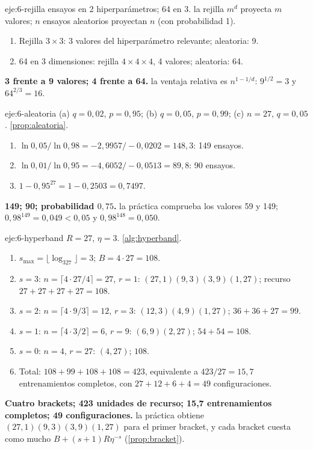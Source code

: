 \begin{solucion}{eje:6-rejilla}
 ensayos en 2 hiperparámetros; 64 en 3.
\planteamiento la rejilla $m^d$ proyecta $m$ valores; $n$ ensayos aleatorios proyectan $n$ (con probabilidad 1).
\pasos
\begin{enumerate}[label=\arabic*.]
  \item Rejilla $3\times3$: 3 valores del hiperparámetro relevante; aleatoria: 9.
  \item 64 en 3 dimensiones: rejilla $4\times4\times4$, 4 valores; aleatoria: 64.
\end{enumerate}
\resultado \textbf{3 frente a 9 valores; 4 frente a 64.}
\comprobacion la ventaja relativa es $n^{1-1/d}$: $9^{1/2}=3$ y $64^{2/3}=16$.
\end{solucion}

\begin{solucion}{eje:6-aleatoria}
\datos (a) $q=0{,}02$, $p=0{,}95$; (b) $q=0{,}05$, $p=0{,}99$; (c) $n=27$, $q=0{,}05$.
\planteamiento \cref{prop:aleatoria}.
\pasos
\begin{enumerate}[label=\arabic*.]
  \item $\ln0{,}05/\ln0{,}98=-2{,}9957/-0{,}0202=148{,}3$: 149 ensayos.
  \item $\ln0{,}01/\ln0{,}95=-4{,}6052/-0{,}0513=89{,}8$: 90 ensayos.
  \item $1-0{,}95^{27}=1-0{,}2503=0{,}7497$.
\end{enumerate}
\resultado \textbf{149; 90; probabilidad $0{,}75$.}
\comprobacion la práctica comprueba los valores 59 y 149; $0{,}98^{149}=0{,}049<0{,}05$ y $0{,}98^{148}=0{,}050$.
\end{solucion}

\begin{solucion}{eje:6-hyperband}
\datos $R=27$, $\eta=3$.
\planteamiento \cref{alg:hyperband}.
\pasos
\begin{enumerate}[label=\arabic*.]
  \item $s_{\max}=\lfloor\log_327\rfloor=3$; $B=4\cdot27=108$.
  \item $s=3$: $n=\lceil4\cdot27/4\rceil=27$, $r=1$: $(27,1)(9,3)(3,9)(1,27)$; recurso $27+27+27+27=108$.
  \item $s=2$: $n=\lceil4\cdot9/3\rceil=12$, $r=3$: $(12,3)(4,9)(1,27)$; $36+36+27=99$.
  \item $s=1$: $n=\lceil4\cdot3/2\rceil=6$, $r=9$: $(6,9)(2,27)$; $54+54=108$.
  \item $s=0$: $n=4$, $r=27$: $(4,27)$; $108$.
  \item Total: $108+99+108+108=423$, equivalente a $423/27=15{,}7$ entrenamientos completos, con $27+12+6+4=49$ configuraciones.
\end{enumerate}
\resultado \textbf{Cuatro brackets; 423 unidades de recurso; 15,7 entrenamientos completos; 49 configuraciones.}
\comprobacion la práctica obtiene $(27,1)(9,3)(3,9)(1,27)$ para el primer bracket, y cada bracket cuesta como mucho $B+(s+1)R\eta^{-s}$ (\cref{prop:bracket}).
\end{solucion}

